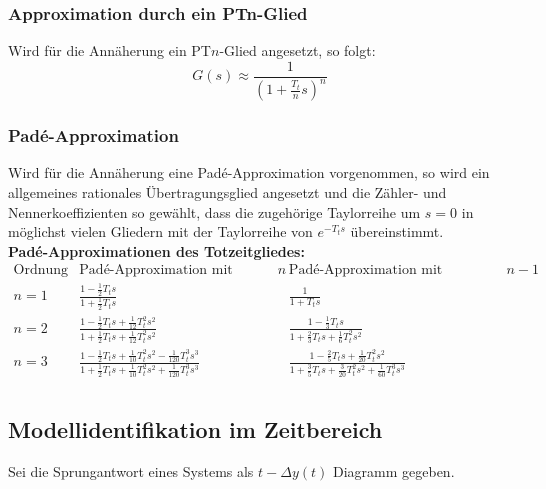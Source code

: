 \documentclass[10pt,a4paper]{article}
\renewcommand{\arraystretch}{1.5}
\begin{document}
\subsubsection{Approximation durch ein PTn-Glied}
Wird für die Annäherung ein PT$n$-Glied angesetzt, so folgt:
$$
	G(s) \approx \frac{1}{(1 + \frac{T_t}{n}s)^n}
$$

\subsubsection{Padé-Approximation}
Wird für die Annäherung eine Padé-Approximation vorgenommen, so wird ein allgemeines rationales Übertragungsglied angesetzt und die Zähler- und Nennerkoeffizienten so gewählt, dass die zugehörige Taylorreihe um $s = 0$ in möglichst vielen Gliedern mit der Taylorreihe von $e^{-T_t s}$ übereinstimmt. \\

\textbf{Padé-Approximationen des Totzeitgliedes:} \\
\renewcommand{\arraystretch}{2}
$\begin{array}{l|c|c}
	\text{Ordnung} & \text{Padé-Approximation mit Zählergrad }n & \text{Padé-Approximation mit Zählergrad }n-1 \\
	\hline
	n = 1 & \frac{1 - \frac 1 2 T_t s}{1 + \frac 1 2 T_t s} & \frac{1}{1 + T_t s} \\
	n = 2 & \frac{1 - \frac 1 2 T_t s + \frac 1 {12} T_t^2 s^2}{1 + \frac 1 2 T_t s + \frac 1 {12} T_t^2 s^2} & \frac{1 - \frac 1 3 T_t s}{1 + \frac 2 3 T_t s + \frac 1 6 T_t^2 s^2} \\
	n = 3 & \frac{1 - \frac 1 2 T_t s + \frac 1 {10} T_t^2 s^2 - \frac 1 {120} T_t^3 s^3}{1 + \frac 1 2 T_t s + \frac 1 {10} T_t^2 s^2 + \frac 1 {120} T_t^3 s^3} & \frac{1 - \frac 2 5 T_t s + \frac 1 {20} T_t^2 s^2}{1 + \frac 3 5 T_t s + \frac 3 {20} T_t^2 s^2 + \frac 1 {60} T_t^3 s^3} \\	
\end{array}$
\renewcommand{\arraystretch}{1.5}

\subsection{Modellidentifikation im Zeitbereich}
Sei die Sprungantwort eines Systems als $t-\Delta y(t)$ Diagramm gegeben. \\
\end{document}
